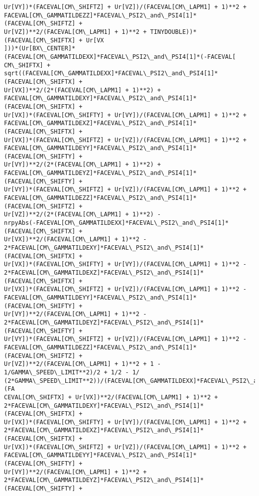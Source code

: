 \documentclass[landscape,letterpaper,10pt,english]{article}
\begin{document}
\begin{Verbatim}[commandchars=\\\{\}]
Ur[VY])*(FACEVAL[CM\_SHIFTZ] + Ur[VZ])/(FACEVAL[CM\_LAPM1] + 1)**2 +
FACEVAL[CM\_GAMMATILDEZZ]*FACEVAL\_PSI2\_and\_PSI4[1]*(FACEVAL[CM\_SHIFTZ] +
Ur[VZ])**2/(FACEVAL[CM\_LAPM1] + 1)**2 + TINYDOUBLE))*(FACEVAL[CM\_SHIFTX] + Ur[VX
]))*(Ur[BX\_CENTER]*(FACEVAL[CM\_GAMMATILDEXX]*FACEVAL\_PSI2\_and\_PSI4[1]*(-FACEVAL[
CM\_SHIFTX] +
sqrt((FACEVAL[CM\_GAMMATILDEXX]*FACEVAL\_PSI2\_and\_PSI4[1]*(FACEVAL[CM\_SHIFTX] +
Ur[VX])**2/(2*(FACEVAL[CM\_LAPM1] + 1)**2) +
FACEVAL[CM\_GAMMATILDEXY]*FACEVAL\_PSI2\_and\_PSI4[1]*(FACEVAL[CM\_SHIFTX] +
Ur[VX])*(FACEVAL[CM\_SHIFTY] + Ur[VY])/(FACEVAL[CM\_LAPM1] + 1)**2 +
FACEVAL[CM\_GAMMATILDEXZ]*FACEVAL\_PSI2\_and\_PSI4[1]*(FACEVAL[CM\_SHIFTX] +
Ur[VX])*(FACEVAL[CM\_SHIFTZ] + Ur[VZ])/(FACEVAL[CM\_LAPM1] + 1)**2 +
FACEVAL[CM\_GAMMATILDEYY]*FACEVAL\_PSI2\_and\_PSI4[1]*(FACEVAL[CM\_SHIFTY] +
Ur[VY])**2/(2*(FACEVAL[CM\_LAPM1] + 1)**2) +
FACEVAL[CM\_GAMMATILDEYZ]*FACEVAL\_PSI2\_and\_PSI4[1]*(FACEVAL[CM\_SHIFTY] +
Ur[VY])*(FACEVAL[CM\_SHIFTZ] + Ur[VZ])/(FACEVAL[CM\_LAPM1] + 1)**2 +
FACEVAL[CM\_GAMMATILDEZZ]*FACEVAL\_PSI2\_and\_PSI4[1]*(FACEVAL[CM\_SHIFTZ] +
Ur[VZ])**2/(2*(FACEVAL[CM\_LAPM1] + 1)**2) -
nrpyAbs(-FACEVAL[CM\_GAMMATILDEXX]*FACEVAL\_PSI2\_and\_PSI4[1]*(FACEVAL[CM\_SHIFTX] +
Ur[VX])**2/(FACEVAL[CM\_LAPM1] + 1)**2 -
2*FACEVAL[CM\_GAMMATILDEXY]*FACEVAL\_PSI2\_and\_PSI4[1]*(FACEVAL[CM\_SHIFTX] +
Ur[VX])*(FACEVAL[CM\_SHIFTY] + Ur[VY])/(FACEVAL[CM\_LAPM1] + 1)**2 -
2*FACEVAL[CM\_GAMMATILDEXZ]*FACEVAL\_PSI2\_and\_PSI4[1]*(FACEVAL[CM\_SHIFTX] +
Ur[VX])*(FACEVAL[CM\_SHIFTZ] + Ur[VZ])/(FACEVAL[CM\_LAPM1] + 1)**2 -
FACEVAL[CM\_GAMMATILDEYY]*FACEVAL\_PSI2\_and\_PSI4[1]*(FACEVAL[CM\_SHIFTY] +
Ur[VY])**2/(FACEVAL[CM\_LAPM1] + 1)**2 -
2*FACEVAL[CM\_GAMMATILDEYZ]*FACEVAL\_PSI2\_and\_PSI4[1]*(FACEVAL[CM\_SHIFTY] +
Ur[VY])*(FACEVAL[CM\_SHIFTZ] + Ur[VZ])/(FACEVAL[CM\_LAPM1] + 1)**2 -
FACEVAL[CM\_GAMMATILDEZZ]*FACEVAL\_PSI2\_and\_PSI4[1]*(FACEVAL[CM\_SHIFTZ] +
Ur[VZ])**2/(FACEVAL[CM\_LAPM1] + 1)**2 + 1 - 1/GAMMA\_SPEED\_LIMIT**2)/2 + 1/2 - 1/
(2*GAMMA\_SPEED\_LIMIT**2))/(FACEVAL[CM\_GAMMATILDEXX]*FACEVAL\_PSI2\_and\_PSI4[1]*(FA
CEVAL[CM\_SHIFTX] + Ur[VX])**2/(FACEVAL[CM\_LAPM1] + 1)**2 +
2*FACEVAL[CM\_GAMMATILDEXY]*FACEVAL\_PSI2\_and\_PSI4[1]*(FACEVAL[CM\_SHIFTX] +
Ur[VX])*(FACEVAL[CM\_SHIFTY] + Ur[VY])/(FACEVAL[CM\_LAPM1] + 1)**2 +
2*FACEVAL[CM\_GAMMATILDEXZ]*FACEVAL\_PSI2\_and\_PSI4[1]*(FACEVAL[CM\_SHIFTX] +
Ur[VX])*(FACEVAL[CM\_SHIFTZ] + Ur[VZ])/(FACEVAL[CM\_LAPM1] + 1)**2 +
FACEVAL[CM\_GAMMATILDEYY]*FACEVAL\_PSI2\_and\_PSI4[1]*(FACEVAL[CM\_SHIFTY] +
Ur[VY])**2/(FACEVAL[CM\_LAPM1] + 1)**2 +
2*FACEVAL[CM\_GAMMATILDEYZ]*FACEVAL\_PSI2\_and\_PSI4[1]*(FACEVAL[CM\_SHIFTY] +

\end{Verbatim}
\end{document}

